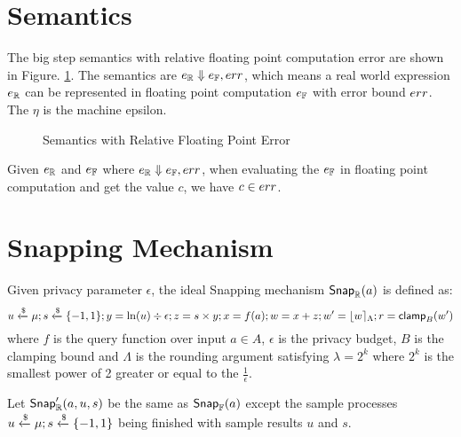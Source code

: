 \documentclass[a4paper,11pt]{article}
\begin{document}
\section{Semantics}

The big step semantics with relative floating point computation error are shown in Figure. \ref{fig_semantics_rel}. The semantics are $e_{\mathbb{R}} \Downarrow e_{\mathbb{F}}, err$, which means a real world expression $e_{\mathbb{R}}$ can be represented in floating point computation $e_{\mathbb{F}}$ with error bound $err$. The $\eta$ is the machine epsilon.

\begin{figure}
\caption{Semantics with Relative Floating Point Error}
\label{fig_semantics_rel}
\end{figure}


\begin{thm}
Given $e_{\mathbb{R}}$ and $e_{\mathbb{F}}$ where  $e_{\mathbb{R}} \Downarrow e_{\mathbb{F}}, err$, when evaluating the $e_{\mathbb{F}}$ in floating point computation and get the value $c$, we have $c \in err$.
\end{thm}




\section{Snapping Mechanism}

\begin{defn}
Given privacy parameter $\epsilon$, the ideal Snapping mechanism $\mathsf{Snap}_{\mathbb{R}}(a)$ is defined as:
\[
	u \xleftarrow{\$} \mu; s \xleftarrow{\$} \{-1, 1\}; y = \ln (u) \div \epsilon; z = s \times y; x = f(a); w = x + z; w' = \lfloor w \rceil_{\Lambda}; r = \mathsf{clamp}_B (w')
\]
where $f$ is the query function over input $a \in A$, $\epsilon$ is the privacy budget, $B$ is the clamping bound and $\Lambda$ is the rounding argument satisfying $\lambda = 2^k$ where $2^k$ is the smallest power of 2 greater or equal to the $\frac{1}{\epsilon}$.
%

%
Let $\mathsf{Snap}_{\mathbb{R}}'(a, u, s)$ be the same as $\mathsf{Snap}_{\mathbb{F}}(a)$ except the sample processes $u \xleftarrow{\$} \mu; s \xleftarrow{\$} \{-1, 1\}$ being finished with sample results $u$ and $s$.
\end{defn}
\end{document}
